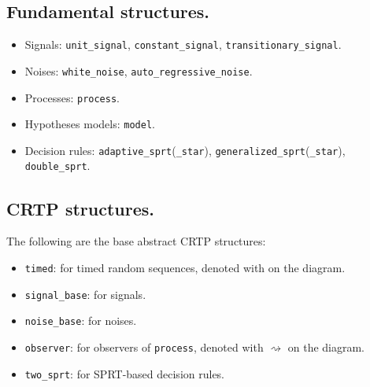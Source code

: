 \documentclass[12pt]{article}
\begin{document}
\begin{center}
\end{center}

\subsection*{Fundamental structures.}

\begin{itemize}
	\item Signals: \texttt{unit\_signal}, \texttt{constant\_signal}, \texttt{transitionary\_signal}.
	\item Noises: \texttt{white\_noise}, \texttt{auto\_regressive\_noise}.
	\item Processes: \texttt{process}.
	\item Hypotheses models: \texttt{model}.
	\item Decision rules: \texttt{adaptive\_sprt}(\texttt{\_star}), \texttt{generalized\_sprt}(\texttt{\_star}), \texttt{double\_sprt}.
\end{itemize}

\subsection*{CRTP structures.}

The following are the base abstract CRTP structures:
\begin{itemize}
    \item \texttt{timed}: for timed random sequences, denoted with \clock{} on the diagram.
    \item \texttt{signal\_base}: for signals.
    \item \texttt{noise\_base}: for noises.
    \item \texttt{observer}: for observers of \texttt{process}, denoted with $\rightsquigarrow $ on the diagram.
    \item \texttt{two\_sprt}: for SPRT-based decision rules.
\end{itemize}
\end{document}
